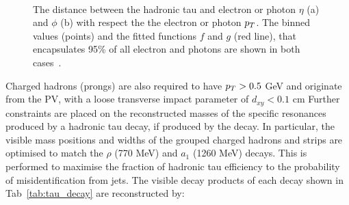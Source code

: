 \begin{figure}[!hbtp]
\centering
     \\
\caption{The distance between the hadronic tau and electron or photon $\eta$ (a) and $\phi$ (b) with respect the the electron or photon $p_{T}$. The binned values (points) and the fitted functions $f$ and $g$ (red line), that encapsulates 95\% of all electron and photons are shown in both cases~\cite{Sirunyan:2018pgf}.}
\label{fig:hps}
\end{figure}

Charged hadrons (prongs) are also required to have $p_{T} > 0.5$ GeV and originate from the \ac{PV}, with a loose transverse impact parameter of $d_{xy} < 0.1$ cm
Further constraints are placed on the reconstructed masses of the specific resonances produced by a hadronic tau decay, if produced by the decay.
In particular, the visible mass positions and widths of the grouped charged hadrons and strips are optimised to match the $\rho$ (770 MeV) and $a_1$ (1260 MeV) decays.
This is performed to maximise the fraction of hadronic tau efficiency to the probability of misidentification from jets.
The visible decay products of each decay shown in Tab~\ref{tab:tau_decay} are reconstructed by:

